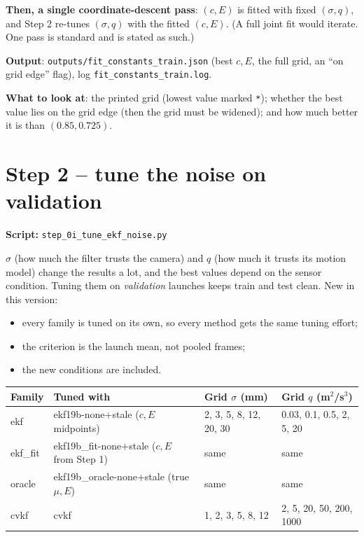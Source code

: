 \documentclass[11pt,a4paper]{article}
\begin{document}
\textbf{Then, a single coordinate-descent pass}: $(c,E)$ is fitted with fixed $(\sigma,q)$, and Step 2 re-tunes
$(\sigma,q)$ with the fitted $(c,E)$. (A full joint fit would iterate. One pass is standard and is stated as such.)

\textbf{Output}: \texttt{outputs/fit\_constants\_train.json} (best $c,E$, the full grid, an ``on grid edge'' flag),
log \texttt{fit\_constants\_train.log}.

\textbf{What to look at}: the printed grid (lowest value marked \texttt{*}); whether the best value lies on the grid edge
(then the grid must be widened); and how much better it is than $(0.85,0.725)$.

\section{Step 2 -- tune the noise on validation}
\noindent\textbf{Script:} \texttt{step\_0i\_tune\_ekf\_noise.py}\par\medskip
\begin{why}[{Purpose}]
$\sigma$ (how much the filter trusts the camera) and $q$ (how much it trusts its motion model) change the results a lot,
and the best values depend on the sensor condition. Tuning them on \emph{validation} launches keeps train and test clean.
New in this version:
\begin{itemize}
\item every family is tuned on its own, so every method gets the same tuning effort;
\item the criterion is the launch mean, not pooled frames;
\item the new conditions are included.
\end{itemize}
\end{why}
\begin{center}\small
\begin{tabular}{@{}llll@{}}\toprule
Family & Tuned with & Grid $\sigma$ (mm) & Grid $q$ (m$^2$/s$^3$)\\\midrule
ekf & ekf19b-none+stale ($c,E$ midpoints) & 2, 3, 5, 8, 12, 20, 30 & 0.03, 0.1, 0.5, 2, 5, 20\\
ekf\_fit & ekf19b\_fit-none+stale ($c,E$ from Step 1) & same & same\\
oracle & ekf19b\_oracle-none+stale (true $\mu,E$) & same & same\\
cvkf & cvkf & 1, 2, 3, 5, 8, 12 & 2, 5, 20, 50, 200, 1000\\\bottomrule
\end{tabular}\end{center}
\end{document}
